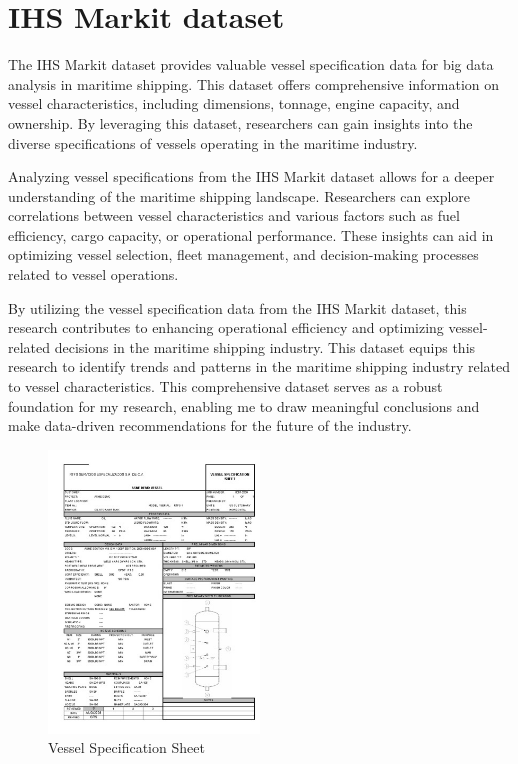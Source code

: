 \section{IHS Markit dataset}

The IHS Markit dataset provides valuable vessel specification data for big data analysis in maritime shipping.
This dataset offers comprehensive information on vessel characteristics, including dimensions, tonnage, engine capacity, and ownership.
By leveraging this dataset, researchers can gain insights into the diverse specifications of vessels operating in the maritime industry.

Analyzing vessel specifications from the IHS Markit dataset allows for a deeper understanding of the maritime shipping landscape.
Researchers can explore correlations between vessel characteristics and various factors such as fuel efficiency, cargo capacity, or operational performance.
These insights can aid in optimizing vessel selection, fleet management, and decision-making processes related to vessel operations.

By utilizing the vessel specification data from the IHS Markit dataset, this research contributes to enhancing operational efficiency and optimizing vessel-related decisions in the maritime shipping industry.
This dataset equips this research to identify trends and patterns in the maritime shipping industry related to vessel characteristics.
This comprehensive dataset serves as a robust foundation for my research, enabling me to draw meaningful conclusions and make data-driven recommendations for the future of the industry.

\begin{figure}[h]
    \centering
    \includegraphics[width=0.5\textwidth]{images/vessel_specification.jpg}
    \caption{Vessel Specification Sheet \autocite{Itur}}
    \label{vessel_specification}
\end{figure}